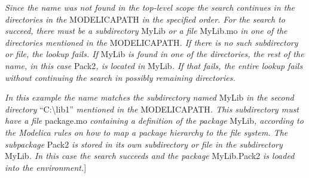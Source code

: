 \emph{Since the name was not found in the top-level scope the search
continues in the directories in the} MODELICAPATH \emph{in the specified
order. For the search to succeed, there must be a subdirectory} MyLib
\emph{or a file} MyLib.mo \emph{in one of the directories mentioned in
the} MODELICAPATH\emph{. If there is no such subdirectory or file, the
lookup fails. If} MyLib \emph{is found in one of the directories, the
rest of the name, in this case} Pack2\emph{, is located in} MyLib\emph{.
If that fails, the entire lookup fails without continuing the search in
possibly remaining directories.}

\emph{In this example the name matches the subdirectory named} MyLib
\emph{in the second directory} ``C:\textbackslash{}lib1''
\emph{mentioned in the} MODELICAPATH\emph{. This subdirectory must have
a file} package.mo \emph{containing a definition of the package}
MyLib\emph{, according to the Modelica rules on how to map a package
hierarchy to the file system. The subpackage} Pack2 \emph{is stored in
its own subdirectory or file in the subdirectory} MyLib\emph{. In this
case the search succeeds and the package} MyLib.Pack2 \emph{is loaded
into the environment.}{]}
